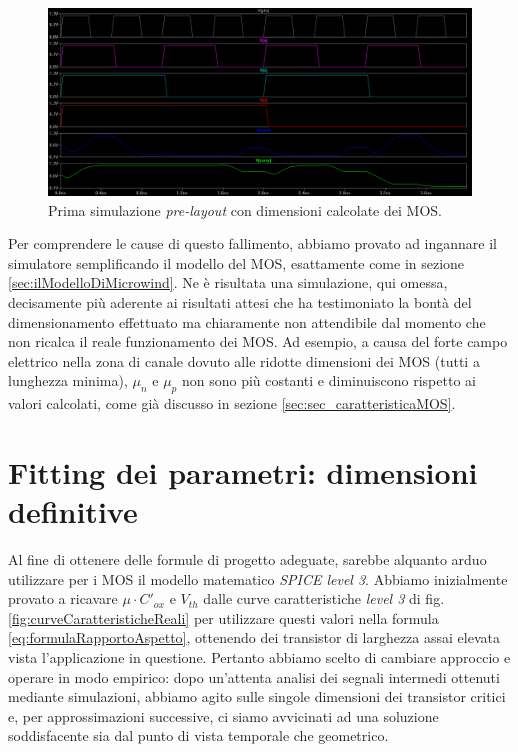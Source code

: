 \begin{figure}[hbt!]
	\centering
	\includegraphics[width=1.3\textwidth, angle=90]{figure/sim_FA_Bad.png}
	\caption{Prima simulazione \textit{pre-layout} con dimensioni calcolate dei MOS.}
	\label{fig:primaSimulazionePreLayout}
\end{figure}

Per comprendere le cause di questo fallimento, abbiamo provato ad ingannare il simulatore semplificando il modello del MOS, esattamente come in sezione \ref{sec:ilModelloDiMicrowind}. Ne è risultata una simulazione, qui omessa, decisamente più aderente ai risultati attesi che ha testimoniato la bontà del dimensionamento effettuato ma chiaramente non attendibile dal momento che non ricalca il reale funzionamento dei MOS. Ad esempio, a causa del forte campo elettrico nella zona di canale dovuto alle ridotte dimensioni dei MOS (tutti a lunghezza minima), $\mu_n$ e $\mu_p$ non sono più costanti e diminuiscono rispetto ai valori calcolati, come già discusso in sezione \ref{sec:sec_caratteristicaMOS}.



\section{Fitting dei parametri: dimensioni definitive}
\label{sec:sec_fittingParametri}
Al fine di ottenere delle formule di progetto adeguate, sarebbe alquanto arduo utilizzare per i MOS il modello matematico \textit{SPICE level 3}. Abbiamo inizialmente provato a ricavare $\mu \cdot C'_{ox}$ e $V_{th}$ dalle curve caratteristiche \textit{level 3} di fig. \ref{fig:curveCaratteristicheReali} per utilizzare questi valori nella formula \ref{eq:formulaRapportoAspetto}, ottenendo dei transistor di larghezza assai elevata vista l'applicazione in questione.
Pertanto abbiamo scelto di cambiare approccio e operare in modo empirico: dopo un'attenta analisi dei segnali intermedi ottenuti mediante simulazioni, abbiamo agito sulle singole dimensioni dei transistor critici e, per approssimazioni successive, ci siamo avvicinati ad una soluzione soddisfacente sia dal punto di vista temporale che geometrico.

